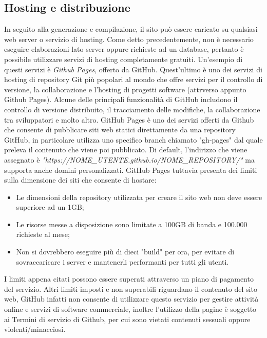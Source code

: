 \documentclass[target=bach,aauheader=]{thud}
\begin{document}
\subsection{Hosting e distribuzione}
In seguito alla generazione e compilazione, il sito può essere caricato su qualsiasi web server o servizio di hosting. Come detto precedentemente, non è necessario eseguire elaborazioni lato server oppure richieste ad un database, pertanto è possibile utilizzare servizi di hosting completamente gratuiti.
\newline
Un'esempio di questi servizi è \textit{Github Pages}, offerto da GitHub. Quest'ultimo è uno dei servizi di hosting di repository Git più popolari al mondo che offre servizi per il controllo di versione, la collaborazione e l'hosting di progetti software (attrverso appunto Github Pages).
Alcune delle principali funzionalità di GitHub includono il controllo di versione distribuito, il tracciamento delle modifiche, la collaborazione tra sviluppatori e molto altro.
GitHub Pages è uno dei servizi offerti da Github che consente di pubblicare siti web statici direttamente da una repository GitHub, in particolare utilizza uno specifico branch chiamato "gh-pages" dal quale preleva il contenuto che viene poi pubblicato.
Di default, l'indirizzo che viene assegnato è \textit{"https://NOME\_UTENTE.github.io/NOME\_REPOSITORY/"} ma supporta anche domini personalizzati. 
\newline 
GitHub Pages tuttavia presenta dei limiti sulla dimensione dei siti che consente di hostare:
\begin{itemize}
    \item Le dimensioni della repository utilizzata per creare il sito web non deve essere superiore ad un 1GB;
    \item Le risorse messe a disposizione sono limitate a 100GB di banda e 100.000 richieste al mese;
    \item Non si dovrebbero eseguire più di dieci "build" per ora, per evitare di sovraccaricare i server e mantenerli performanti per tutti gli utenti.
\end{itemize}
I limiti appena citati possono essere superati attraverso un piano di pagamento del servizio.
\newline
Altri limiti imposti e non superabili riguardano il contenuto del sito web, GitHub infatti non consente di utilizzare questo servizio per gestire attività online e servizi di software commerciale, inoltre l'utilizzo della pagine è soggetto ai Termini di servizio di Github,
per cui sono vietati contenuti sessuali oppure violenti/minacciosi. 
\end{document}

